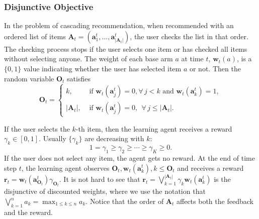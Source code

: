 \documentclass{article}
\newcommand{\bA}{\mathbf{A}}
\newcommand{\ba}{\mathbf{a}}
\newcommand{\bO}{\mathbf{O}}
\newcommand{\br}{\mathbf{r}}
\newcommand{\bw}{\mathbf{w}}
\newcommand{\abs}[1]{\left| #1 \right|}
\begin{document}
\subsubsection{Disjunctive Objective}
\label{sec:disj}

In the problem of cascading recommendation, when recommended with an ordered list of items $\bA_t = (\ba_{1}^t,...,\ba_{\abs{\bA_t}}^t)$, the user checks the list in that order. The checking process stops if the user selects one item or has checked all items without selecting anyone. The weight of each base arm $a$ at time $t$, $\bw_{t}(a)$, is a $\{0,1\}$ value indicating whether the user has selected item $a$ or not. Then the random variable $\bO_t$ satisfies
$$
\bO_t = \begin{cases}
k, &\text{ if } \bw_t(\ba_j^t)=0, \forall\, j < k \text{ and } \bw_t(\ba_k^t) = 1,\\
\abs{\bA_t}, &\text{ if }\bw_t(\ba_j^t) = 0, ~~ \forall\, j \leq \abs{\bA_t}.
\end{cases}
$$

If the user selects the $k$-th item, then the learning agent receives a reward $\gamma_k \in [0,1]$. Usually $\{\gamma_k\}$ are decreasing with $k$:
$$
1 = \gamma_1 \geq \gamma_2 \geq \cdots \geq \gamma_K \geq 0.
$$
If the user does not select any item, the agent gets no reward. At the end of time step $t$, the learning agent observes $\bO_t, \bw_t(\ba_k^t), k \leq \bO_t$ and receives a reward
$\br_t = \bw_t(\ba_{\bO_t}^t) \gamma_{\bO_t}$. It is not hard to see that $\br_t = \bigvee_{k=1}^{\abs{\bA_t}} \gamma_k \bw_t(\ba_k^t)$ is the disjunctive of discounted weights,
where we use the notation that $\bigvee_{k=1}^n a_k = \max_{1 \leq k \leq n} a_k$. Notice that the order of $\bA_t$ affects both the feedback and the reward.
\end{document}
